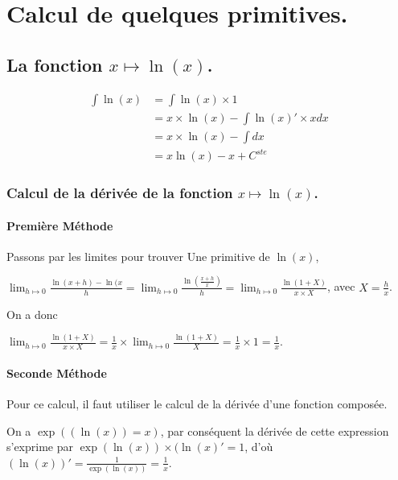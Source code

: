 \documentclass[a4paper,landscape,17pt]{extreport} %
\begin{document}


\chapter{Calcul de quelques primitives.}

\section{La fonction  $x \mapsto \ln(x) $.}

\begin{align*}
\int \ln(x) & =  \int \ln(x) \times 1 \\ & =  x \times \ln(x) - \int \ln(x)' \times x dx \\ & =  x \times \ln(x) - \int  dx \\ & =   x  \ln(x) - x + C^{ste}
\end{align*}

\subsection{Calcul de la dérivée de la fonction $x \mapsto \ln(x) $.}


\subsubsection{Première Méthode}


Passons par les limites pour trouver Une primitive de $\ln(x)$,

$ \lim_{h \mapsto 0} \frac{\ln(x+h) - \ln(x}{h} = \lim_{h \mapsto 0} \frac{\ln(\frac{x+h}{x})}{h}  = \lim_{h \mapsto 0} \frac{ \ln(1+X)}{x\times X}$, avec $X=\frac{h}{x}$.


On a donc 

$\lim_{h \mapsto 0} \frac{\ln(1+X)}{x\times X} = \frac{1}{x} \times \lim_{h \mapsto 0} \frac{\ln(1+X)}{X} = \frac{1}{x} \times 1 = \frac{1}{x}$.




\subsubsection{Seconde Méthode}

Pour ce calcul, il faut utiliser le calcul de la dérivée d'une fonction composée. 

On a $\exp((\ln(x))=x)$, par conséquent la dérivée de cette expression s'exprime par $ \exp(\ln(x)) \times (\ln(x)' = 1$, d'où $(\ln(x))' = \frac{1}{\exp(\ln(x))}  = \frac{1}{x} $.
\end{document}
